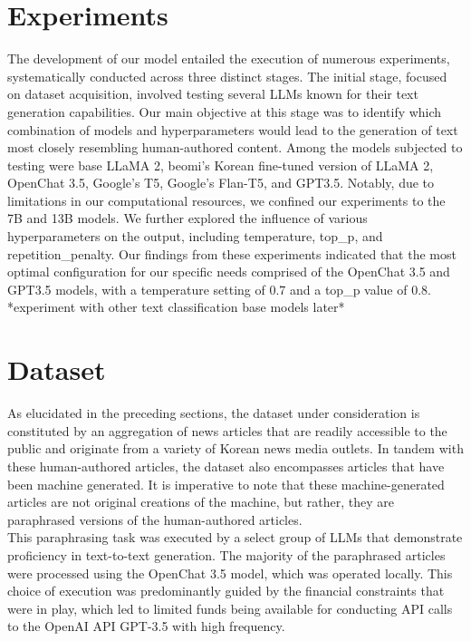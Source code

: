 \documentclass{article}
\begin{document}
\section{Experiments}
\null\quad The development of our model entailed the execution of numerous experiments, systematically conducted across three distinct stages.
The initial stage, focused on dataset acquisition, involved testing several LLMs known for their text generation capabilities.
Our main objective at this stage was to identify which combination of models and hyperparameters would lead to the generation of text most closely resembling human-authored content.
Among the models subjected to testing were base LLaMA 2, beomi's Korean fine-tuned version of LLaMA 2, OpenChat 3.5, Google's T5, Google's Flan-T5, and GPT3.5.
Notably, due to limitations in our computational resources, we confined our experiments to the 7B and 13B models.
We further explored the influence of various hyperparameters on the output, including temperature, top\_p, and repetition\_penalty.
Our findings from these experiments indicated that the most optimal configuration for our specific needs comprised of the OpenChat 3.5 and GPT3.5 models, with a temperature setting of 0.7 and a top\_p value of 0.8. \\

*experiment with other text classification base models later*

\section{Dataset}
\null\quad As elucidated in the preceding sections, the dataset under consideration is constituted by an aggregation of news articles that are readily accessible to the public and originate from a variety of Korean news media outlets.
In tandem with these human-authored articles, the dataset also encompasses articles that have been machine generated.
It is imperative to note that these machine-generated articles are not original creations of the machine, but rather, they are paraphrased versions of the human-authored articles. \\
\null\quad This paraphrasing task was executed by a select group of LLMs that demonstrate proficiency in text-to-text generation.
The majority of the paraphrased articles were processed using the OpenChat 3.5 model, which was operated locally.
This choice of execution was predominantly guided by the financial constraints that were in play, which led to limited funds being available for conducting API calls to the OpenAI API GPT-3.5 with high frequency.
\end{document}
